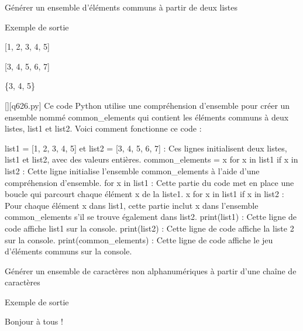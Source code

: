         \question
        Générer un ensemble d'éléments communs à partir de deux listes

Exemple de sortie

[1, 2, 3, 4, 5]

[3, 4, 5, 6, 7]

\{3, 4, 5\}
        \par
        \begin{solution}
            \renewcommand{\nomfichier}{q626.py}
            \pythonfile{\chemincode \nomfichier}[][\nomfichier]
            Ce code Python utilise une compréhension d'ensemble pour créer un ensemble nommé common_elements qui contient les éléments communs à deux listes, list1 et list2. Voici comment fonctionne ce code :

    list1 = [1, 2, 3, 4, 5] et list2 = [3, 4, 5, 6, 7] : Ces lignes initialisent deux listes, list1 et list2, avec des valeurs entières.
    common_elements = {x for x in list1 if x in list2} : Cette ligne initialise l'ensemble common_elements à l'aide d'une compréhension d'ensemble.
        for x in list1 : Cette partie du code met en place une boucle qui parcourt chaque élément x de la liste1.
        {x for x in list1 if x in list2} : Pour chaque élément x dans list1, cette partie inclut x dans l'ensemble common_elements s'il se trouve également dans list2.
    print(list1) : Cette ligne de code affiche list1 sur la console.
    print(list2) : Cette ligne de code affiche la liste 2 sur la console.
    print(common_elements) : Cette ligne de code affiche le jeu d'éléments communs sur la console.
        \end{solution}
        

        \question
        Générer un ensemble de caractères non alphanumériques à partir d'une chaîne de caractères

Exemple de sortie

Bonjour à tous !

